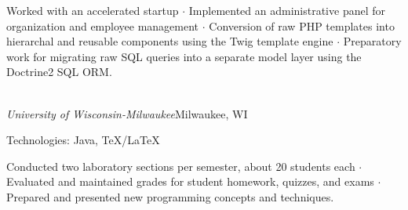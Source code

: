 \documentclass[11pt]{article}
\newcommand{\marginhead}[1]{\marginpar{\textsf{{\footnotesize\flushright #1}}}}
\newcommand{\smaller}{\fontsize{9}{11}\selectfont}
\begin{document}
\vspace{-.25cm}

\noindent        Worked with an accelerated startup
{\large $\cdot$} Implemented an administrative panel for organization and employee management
{\large $\cdot$} Conversion of raw PHP templates into hierarchal and reusable components using the Twig template engine
{\large $\cdot$} Preparatory work for migrating raw SQL queries into a separate model layer using the Doctrine2 SQL ORM.

\bigskip


\marginhead{{\vskip -1.15em}\hfill Teaching}


 \\ {\it University of Wisconsin-Milwaukee}\hfill Milwaukee, WI

\begin{description}
	\setlength{\itemsep}{2pt}\small\begin{spacing}{1}
	
	\item[\smaller Technologies:] {\small Java, \TeX/\LaTeX}
	
	\end{spacing}
\end{description}

\vspace{-.25cm}

\noindent        Conducted two laboratory sections per semester, about 20 students each
{\large $\cdot$} Evaluated and maintained grades for student homework, quizzes, and exams
{\large $\cdot$} Prepared and presented new programming concepts and techniques.
\end{document}
